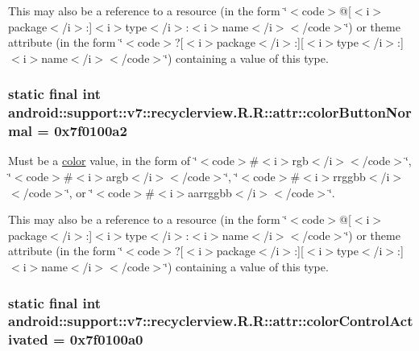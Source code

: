 This may also be a reference to a resource (in the form \char`\"{}$<$code$>$@\mbox{[}$<$i$>$package$<$/i$>$:\mbox{]}$<$i$>$type$<$/i$>$:$<$i$>$name$<$/i$>$$<$/code$>$\char`\"{}) or theme attribute (in the form \char`\"{}$<$code$>$?\mbox{[}$<$i$>$package$<$/i$>$:\mbox{]}\mbox{[}$<$i$>$type$<$/i$>$:\mbox{]}$<$i$>$name$<$/i$>$$<$/code$>$\char`\"{}) containing a value of this type. \hypertarget{classandroid_1_1support_1_1v7_1_1recyclerview_1_1_r_1_1attr_f01dfa431ad114bcdb4d80a0c35f84ed}{
\subsubsection[{colorButtonNormal}]{\setlength{\rightskip}{0pt plus 5cm}static final int android::support::v7::recyclerview.R.R::attr::colorButtonNormal = 0x7f0100a2}}
\label{classandroid_1_1support_1_1v7_1_1recyclerview_1_1_r_1_1attr_f01dfa431ad114bcdb4d80a0c35f84ed}


Must be a \hyperlink{classandroid_1_1support_1_1v7_1_1recyclerview_1_1_r_1_1color}{color} value, in the form of \char`\"{}$<$code$>$\#$<$i$>$rgb$<$/i$>$$<$/code$>$\char`\"{}, \char`\"{}$<$code$>$\#$<$i$>$argb$<$/i$>$$<$/code$>$\char`\"{}, \char`\"{}$<$code$>$\#$<$i$>$rrggbb$<$/i$>$$<$/code$>$\char`\"{}, or \char`\"{}$<$code$>$\#$<$i$>$aarrggbb$<$/i$>$$<$/code$>$\char`\"{}. 

This may also be a reference to a resource (in the form \char`\"{}$<$code$>$@\mbox{[}$<$i$>$package$<$/i$>$:\mbox{]}$<$i$>$type$<$/i$>$:$<$i$>$name$<$/i$>$$<$/code$>$\char`\"{}) or theme attribute (in the form \char`\"{}$<$code$>$?\mbox{[}$<$i$>$package$<$/i$>$:\mbox{]}\mbox{[}$<$i$>$type$<$/i$>$:\mbox{]}$<$i$>$name$<$/i$>$$<$/code$>$\char`\"{}) containing a value of this type. \hypertarget{classandroid_1_1support_1_1v7_1_1recyclerview_1_1_r_1_1attr_1b5d56b9bee4f00b18eae449702e74b8}{
\subsubsection[{colorControlActivated}]{\setlength{\rightskip}{0pt plus 5cm}static final int android::support::v7::recyclerview.R.R::attr::colorControlActivated = 0x7f0100a0}}
\label{classandroid_1_1support_1_1v7_1_1recyclerview_1_1_r_1_1attr_1b5d56b9bee4f00b18eae449702e74b8}


